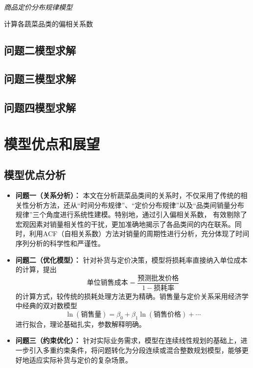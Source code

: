 \documentclass{article}
\begin{document}
\textit{商品定价分布规律模型}

计算各蔬菜品类的偏相关系数
\subsection{问题二模型求解}

\subsection{问题三模型求解}

\subsection{问题四模型求解}



\section{模型优点和展望}
\subsection{模型优点分析}
\begin{itemize}
    \item \textbf{问题一（关系分析）：} 本文在分析蔬菜品类间的关系时，不仅采用了传统的相关性分析方法，还从“时间分布规律”、“定价分布规律”以及“品类间销量分布规律”三个角度进行系统性建模。特别地，通过引入偏相关系数，
    有效剔除了宏观因素对销量相关性的干扰，更加准确地揭示了各品类间的内在联系。同时，利用ACF（自相关系数）方法对销量的周期性进行分析，充分体现了时间序列分析的科学性和严谨性。

    \item \textbf{问题二（优化模型）：} 针对补货与定价决策，模型将损耗率直接纳入单位成本的计算，提出
    \[
    \text{单位销售成本} = \frac{\text{预测批发价格}}{1 - \text{损耗率}}
    \]
    的计算方式，较传统的损耗处理方法更为精确。销售量与定价关系采用经济学中经典的双对数模型
    \[
    \ln(\text{销售量}) = \beta_0 + \beta_1 \ln(\text{销售价格}) + \cdots
    \]
    进行拟合，理论基础扎实，参数解释明确。

    \item \textbf{问题三（约束优化）：} 针对实际业务需求，模型在连续线性规划的基础上，进一步引入多重约束条件，将问题转化为分段连续或混合整数规划模型，能够更好地适应实际补货与定价的复杂场景。
\end{itemize}
\newpage
\end{document}
